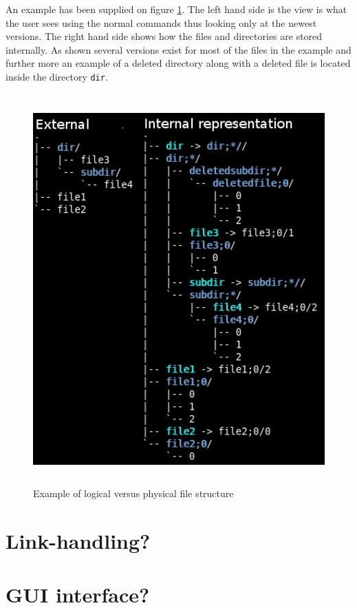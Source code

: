 \documentclass[12pt]{article}
\begin{document}
An example has been supplied on figure \ref{structurefig}. The left hand
side is the view is what the user sees using the normal commands thus
looking only at the newest versions. The right hand side shows how the
files and directories are stored internally. As shown several versions
exist for most of the files in the example and further more an example of
a deleted directory along with a deleted file is located inside the
directory \texttt{dir}.

\begin{figure}
\begin{center}
\includegraphics[height=150mm]{filestructure.png}
\end{center}
\caption{Example of logical versus physical file structure}
\label{structurefig}
\end{figure}

\section{Link-handling?}

\section{GUI interface?}




 
\end{document}
